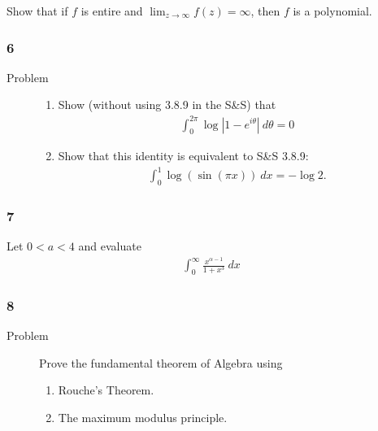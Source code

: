 \begin{description}
\tightlist
\item[Problem]
Show that if \(f\) is entire and \(\lim_{z\to\infty}f(z) = \infty\),
then \(f\) is a polynomial.
\end{description}

\hypertarget{section-73}{%
\subsubsection{6}\label{section-73}}

\begin{description}
\item[Problem]
\hfill

\begin{enumerate}
\def\labelenumi{\alph{enumi}.}
\tightlist
\item
  Show (without using 3.8.9 in the S\&S) that
  \begin{align*}
  \int_0^{2\pi} \log{\left\lvert {1 - e^{i\theta}} \right\rvert}~d\theta = 0
  \end{align*}
\item
  Show that this identity is equivalent to S\&S 3.8.9:
  \begin{align*}
  \int_0^1 \log(\sin(\pi x)) ~dx = -\log 2
  .\end{align*}
\end{enumerate}
\end{description}

\hypertarget{section-74}{%
\subsubsection{7}\label{section-74}}

\begin{description}
\tightlist
\item[Problem]
Let \(0<a<4\) and evaluate
\begin{align*}
  \int_0^\infty \frac{x^{\alpha-1}}{1+x^3} ~dx
  \end{align*}
\end{description}

\hypertarget{section-75}{%
\subsubsection{8}\label{section-75}}

\begin{description}
\item[Problem]
Prove the fundamental theorem of Algebra using

\begin{enumerate}
\def\labelenumi{\alph{enumi}.}
\tightlist
\item
  Rouche's Theorem.
\item
  The maximum modulus principle.
\end{enumerate}
\end{description}

